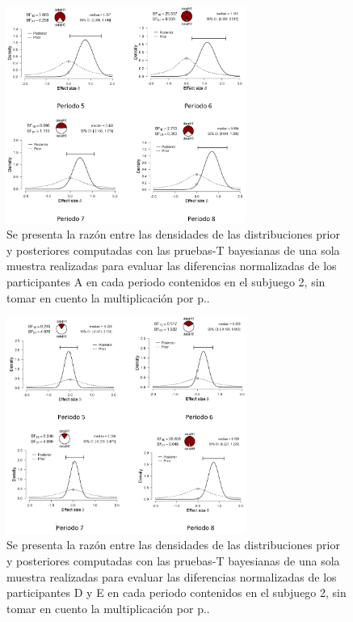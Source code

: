 \begin{figure}[th]
\centering
\includegraphics[width=0.70\textwidth]{Figures/Fig_15} 
\caption[Cambio en el número elegido periodo a periodo.]{Se presenta la razón entre las densidades de las distribuciones prior y posteriores  computadas con las pruebas-T bayesianas de una sola muestra realizadas para evaluar las diferencias normalizadas de los participantes A en cada periodo contenidos en el subjuego 2, sin tomar en cuento la multiplicación por p..}
\label{fig:DiferenciasRelativas_Subjuego2_A_NoP}
\end{figure}

\begin{figure}[th]
\centering
\includegraphics[width=0.70\textwidth]{Figures/Fig_16} 
\caption[Cambio en el número elegido periodo a periodo.]{Se presenta la razón entre las densidades de las distribuciones prior y posteriores  computadas con las pruebas-T bayesianas de una sola muestra realizadas para evaluar las diferencias normalizadas de los participantes D y E en cada periodo contenidos en el subjuego 2, sin tomar en cuento la multiplicación por p..}
\label{fig:DiferenciasRelativas_Subjuego2_DE_NoP}
\end{figure}

